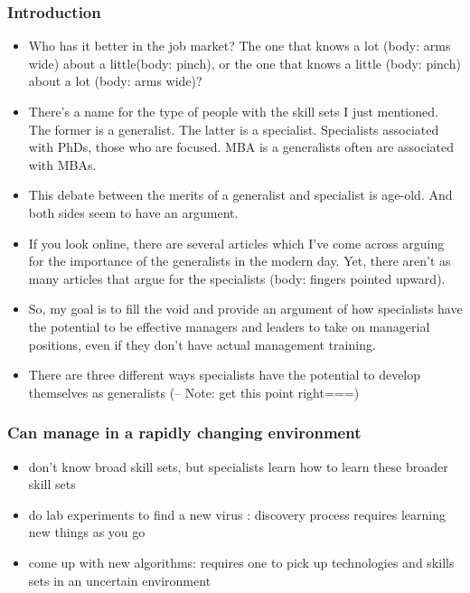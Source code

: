 \begin{frame}[Introduction]
\frametitle{Introduction}
\begin{itemize}
\item \small Who has it better in the job market? The one that knows a lot (body: arms wide) about
  a little(body: pinch), or the one that knows a little (body: pinch) about a lot (body: arms wide)?
\item \small There's a name for the type of people with the skill sets
  I just mentioned. The former is a generalist. The latter is a
  specialist. Specialists associated with PhDs, those who are focused.
MBA is a generalists often are associated with MBAs.
\item \small This debate between the merits of a generalist and specialist is
  age-old. And both sides seem to have an argument.
\item \small If you look online, there are several articles which I've come across
  arguing for the importance of the generalists in the modern day.
  Yet, there aren't as many articles that argue for the
  specialists (body: fingers pointed upward).
\item \small So, my goal is to fill the void and provide an argument of how specialists have the potential to be effective managers and leaders to take on managerial positions, even if they don't have actual management training.


\item There are three different ways specialists have the potential to develop themselves as generalists (-- Note: get this point right===)
\end{itemize}
\end{frame}

\begin{frame}
\frametitle{Can manage in a rapidly changing environment}
\begin{itemize}
\item don't know broad skill sets, but specialists learn how to learn these broader skill sets
\item do lab experiments to find a new virus : discovery process requires learning new things as you go
\item come up with new algorithms: requires one to pick up technologies and skills sets in an uncertain environment
\end{itemize}
\end{frame}

